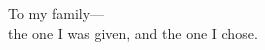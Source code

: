 \begin{dedication}
    To my family---\\
    the one I was given, and the one I chose.
\end{dedication}
